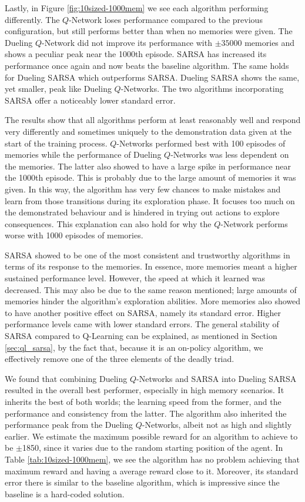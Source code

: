 Lastly, in Figure \ref{fig:10sized-1000mem} we see each algorithm performing differently. The $Q$-Network loses performance compared to the previous configuration, but still performs better than when no memories were given. The Dueling $Q$-Network did not improve its performance with $\pm 35000$ memories and shows a peculiar peak near the 1000th episode. SARSA has increased its performance once again and now beats the baseline algorithm. The same holds for Dueling SARSA which outperforms SARSA. Dueling SARSA shows the same, yet smaller, peak like Dueling $Q$-Networks. The two algorithms incorporating SARSA offer a noticeably lower standard error.

The results show that all algorithms perform at least reasonably well and respond very differently and sometimes uniquely to the demonstration data given at the start of the training process. $Q$-Networks performed best with 100 episodes of memories while the performance of Dueling $Q$-Networks was less dependent on the memories. The latter also showed to have a large spike in performance near the 1000th episode. This is probably due to the large amount of memories it was given. In this way, the algorithm has very few chances to make mistakes and learn from those transitions during its exploration phase. It focuses too much on the demonstrated behaviour and is hindered in trying out actions to explore consequences. This explanation can also hold for why the $Q$-Network performs worse with 1000 episodes of memories.

SARSA showed to be one of the most consistent and trustworthy algorithms in terms of its response to the memories. In essence, more memories meant a higher sustained performance level. However, the speed at which it learned was decreased. This may also be due to the same reason mentioned; large amounts of memories hinder the algorithm's exploration abilities. More memories also showed to have another positive effect on SARSA, namely its standard error. Higher performance levels came with lower standard errors. The general stability of SARSA compared to Q-Learning can be explained, as mentioned in Section \ref{sec:ql_sarsa}, by the fact that, because it is an on-policy algorithm, we effectively remove one of the three elements of the deadly triad. 

We found that combining Dueling $Q$-Networks and SARSA into Dueling SARSA resulted in the overall best performer, especially in high memory scenarios. It inherits the best of both worlds; the learning speed from the former, and the performance and consistency from the latter. The algorithm also inherited the performance peak from the Dueling $Q$-Networks, albeit not as high and slightly earlier. We estimate the maximum possible reward for an algorithm to achieve to be $\pm$1850, since it varies due to the random starting position of the agent. In Table \ref{tab:10sized-1000mem}, we see the algorithm has no problem achieving that maximum reward and having a average reward close to it. Moreover, its standard error there is similar to the baseline algorithm, which is impressive since the baseline is a hard-coded solution.

